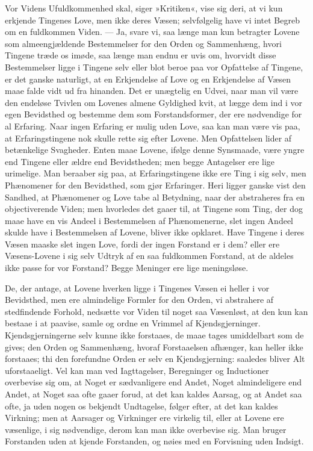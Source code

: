 \documentclass[12pt]{book}
\newcommand{\apage}[1]{\marginnote{\footnotesize\textit{[#1]}}}
\begin{document}
Vor Videns Ufuldkommenhed skal, siger »Kritiken«, vise sig deri, at vi kun
erkjende Tingenes Love, men ikke deres Væsen; selvfølgelig have vi intet
Begreb om en fuldkommen Viden. --- Ja, svare vi, saa længe man kun
betragter Lovene som almeengjældende Bestemmelser for den Orden og
Sammenhæng, hvori Tingene træde os imøde, saa længe man endnu er uvis om,
hvorvidt disse Bestemmelser ligge i Tingene selv eller blot beroe paa vor
Opfattelse af Tingene, er det ganske naturligt, at en Erkjendelse af Love
og en Erkjendelse af Væsen maae falde vidt ud fra hinanden. Det er
unægtelig en Udvei, naar man vil være den endeløse Tvivlen om Lovenes
almene Gyldighed kvit, at lægge dem ind i vor egen Bevidsthed og bestemme
dem som Forstandsformer, der ere nødvendige for al Erfaring. Naar ingen
Erfaring er mulig uden Love, saa kan man være vis paa, at Erfaringstingene
nok skulle rette sig efter Lovene. Men Opfattelsen lider af  \apage{66} betænkelige
Svagheder. Enten maae Lovene, ifølge denne Synsmaade, være yngre end
Tingene eller ældre end Bevidstheden; men begge Antagelser ere lige
urimelige. Man beraaber sig paa, at Erfaringstingene ikke ere Ting i sig
selv, men Phænomener for den Bevidsthed, som gjør Erfaringer. Heri ligger
ganske vist den Sandhed, at Phænomener og Love tabe al Betydning, naar der
abstraheres fra en objectiverende Viden; men hvorledes det gaaer til, at
Tingene som Ting, der dog maae have en vis Andeel i Bestemmelsen af
Phænomenerne, slet ingen Andeel skulde have i Bestemmelsen af Lovene,
bliver ikke opklaret. Have Tingene i deres Væsen maaske slet ingen Love,
fordi der ingen Forstand er i dem? eller ere Væsens-Lovene i sig selv
Udtryk af en saa fuldkommen Forstand, at de aldeles ikke passe for vor
Forstand? Begge Meninger ere lige meningsløse.

De, der antage, at Lovene hverken ligge i Tingenes Væsen ei heller i vor
Bevidsthed, men ere almindelige Formler for den Orden, vi abstrahere af
stedfindende Forhold, nedsætte vor Viden til noget saa Væsenløst, at den
kun kan bestaae i at paavise, samle og ordne en Vrimmel af Kjendsgjerninger.
Kjendsgjerningerne selv kunne ikke forstaaes, de maae tages umiddelbart som
de gives; den Orden og Sammenhæng, hvoraf Forstaaelsen afhænger, kan heller
ikke forstaaes; thi den forefundne Orden er selv en Kjendsgjerning:
saaledes bliver Alt uforstaaeligt. Vel kan man ved Iagttagelser,
Beregninger og Inductioner overbevise sig om, at Noget er sædvanligere end
Andet, \apage{67} Noget almindeligere end Andet, at Noget saa ofte gaaer forud, at det
kan kaldes Aarsag, og at Andet saa ofte, ja uden nogen os bekjendt
Undtagelse, følger efter, at det kan kaldes Virkning; men at Aarsager og
Virkninger ere virkelig til, eller at Lovene ere væsenlige, i sig
nødvendige, derom kan man ikke overbevise sig. Man bruger Forstanden uden
at kjende Forstanden, og nøies med en Forvisning uden Indsigt.
\end{document}
